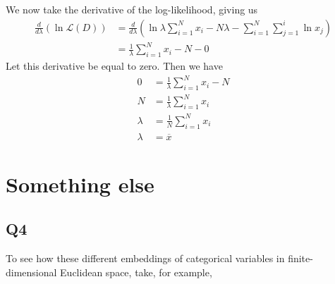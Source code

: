 \documentclass{article}
\theoremstyle{definition}
\begin{document}
        We now take the derivative of the log-likelihood, giving us 
        \begin{align*}
            \frac{d}{d\lambda}\left(
                \ln \mathcal{L}(D)
            \right) &= \frac{d}{d\lambda}\left(
                \ln \lambda \sum_{i = 1}^Nx_i - N\lambda - \sum_{i = 1}^N \sum_{j = 1}^i \ln x_j
            \right) \\
            &=\frac{1}{\lambda} \sum_{i=1}^N x_i - N - 0
        \end{align*}
        Let this derivative be equal to zero. Then we have 
        \begin{align*}
            0 &= \frac{1}{\lambda}\sum_{i=1}^N x_i - N \\
            N &= \frac{1}{\lambda} \sum_{i = 1}^N x_i \\
            \lambda &= \frac{1}{N} \sum_{i = 1}^N x_i \\
            \lambda &= \overline{x}
        \end{align*}
\section{Something else}
    \subsection{Q4}
    To see how these different embeddings of categorical variables in finite-dimensional Euclidean space,
    take, for example,
\end{document}
